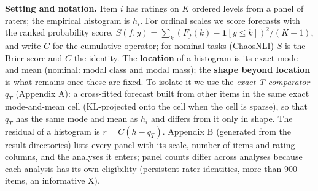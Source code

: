 \documentclass[10pt]{article}
\begin{document}
\textbf{Setting and notation.} Item \(i\) has ratings on \(K\) ordered levels from a panel of raters; the empirical histogram is \(h_i\). For ordinal scales we score forecasts with the ranked probability score, \(S(f,y)=\sum_k (F_f(k)-\mathbf 1[y\le k])^2/(K-1)\), and write \(C\) for the cumulative operator; for nominal tasks (ChaosNLI) \(S\) is the Brier score and \(C\) the identity. The \textbf{location} of a histogram is its exact mode and mean (nominal: modal class and modal mass); the \textbf{shape beyond location} is what remains once these are fixed. To isolate it we use the \emph{exact-T comparator} \(q_T\) (Appendix A): a cross-fitted forecast built from other items in the same exact mode-and-mean cell (KL-projected onto the cell when the cell is sparse), so that \(q_T\) has the same mode and mean as \(h_i\) and differs from it only in shape. The residual of a histogram is \(r = C(h - q_T)\). Appendix B (generated from the result directories) lists every panel with its scale, number of items and rating columns, and the analyses it enters; panel counts differ across analyses because each analysis has its own eligibility (persistent rater identities, more than 900 items, an informative X).
\end{document}
